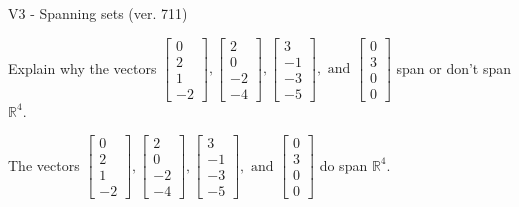 \begin{exercise}
  \begin{exerciseTitle}V3 - Spanning sets (ver. 711)\end{exerciseTitle}
  \begin{exerciseStatement}
    Explain why the vectors \(\left[\begin{array}{r}
0 \\
2 \\
1 \\
-2
\end{array}\right] , \left[\begin{array}{r}
2 \\
0 \\
-2 \\
-4
\end{array}\right] , \left[\begin{array}{r}
3 \\
-1 \\
-3 \\
-5
\end{array}\right] , \text{ and } \left[\begin{array}{r}
0 \\
3 \\
0 \\
0
\end{array}\right]\) span or don't span \(\mathbb{R}^4\). 
	


  \end{exerciseStatement}
  \begin{exerciseAnswer}
   The vectors \(\left[\begin{array}{r}
0 \\
2 \\
1 \\
-2
\end{array}\right] , \left[\begin{array}{r}
2 \\
0 \\
-2 \\
-4
\end{array}\right] , \left[\begin{array}{r}
3 \\
-1 \\
-3 \\
-5
\end{array}\right] , \text{ and } \left[\begin{array}{r}
0 \\
3 \\
0 \\
0
\end{array}\right]\) 
  	 do  
	span \(\mathbb{R}^4\).
  


  \end{exerciseAnswer}
\end{exercise}